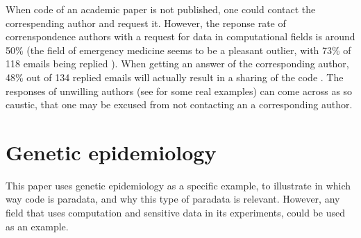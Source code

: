 
When code of an academic paper is not published, 
one could contact the correspending author and request it.
However, the reponse rate of correnspondence authors 
with a request for data in computational fields is around 50\% 
\cite{manca2018non, stodden2018empirical, teunis2015corresponding} 
(the field of emergency medicine seems to be a pleasant outlier, 
with 73\% of 118 emails being replied \cite{o2003email}).
When getting an answer of the corresponding author, 
48\% out of 134 replied emails will actually result 
in a sharing of the code \cite{stodden2018empirical}.
The responses of unwilling authors (see \cite{stodden2018empirical} for 
some real examples) can come across as so caustic, 
that one may be excused from not contacting an a corresponding author.

\section{Genetic epidemiology}


This paper uses genetic epidemiology as a specific example,
to illustrate in which way code is paradata,
and why this type of paradata is relevant.
However, any field that uses computation 
and sensitive data in its experiments,
could be used as an example.


